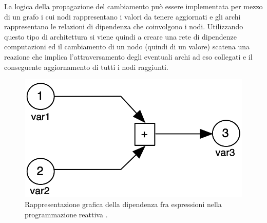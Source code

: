 \documentclass[12pt,a4paper,openright,twoside]{book}
\begin{document}
La logica della propagazione del cambiamento può essere implementata per mezzo di un grafo i cui nodi rappresentano i valori da tenere aggiornati e gli archi rappresentano le relazioni di dipendenza che coinvolgono i nodi. Utilizzando questo tipo di architettura si viene quindi a creare una rete di dipendenze computazioni ed il cambiamento di un nodo (quindi di un valore) scatena una reazione che implica l'attraversamento degli eventuali archi ad eso collegati e il conseguente aggiornamento di tutti i nodi raggiunti. 

\begin{figure}
    \centering
    \includegraphics[width=.65\linewidth]{figures/reactive-programming/RP-dependency.png}
    \caption{Rappresentazione grafica della dipendenza fra espressioni nella programmazione reattiva \cite{DBLP:journals/csur/BainomugishaCCMM13}.}
    \label{fig:rp-dependency}
\end{figure}
\end{document}
